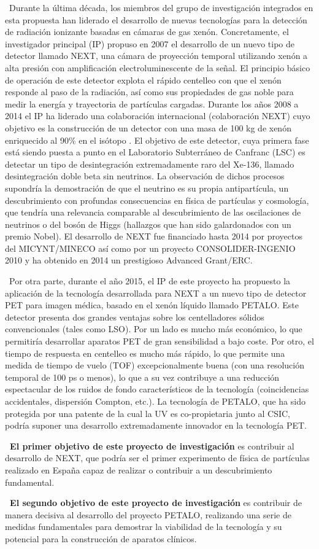 ~Durante la última década, los miembros del grupo de investigación integrados en esta propuesta han liderado el desarrollo de nuevas tecnologías para la detección de radiación ionizante basadas en cámaras de gas xenón. Concretamente, el investigador principal (IP) propuso en 2007 el desarrollo de un nuevo tipo de detector llamado NEXT, una cámara de proyección temporal utilizando xenón a alta presión con amplificación electroluminescente de la señal. El principio básico de operación de este detector explota el rápido centelleo con que el xenón responde al paso de la radiación, así como sus propiedades de gas noble para medir la energía y trayectoria de partículas cargadas. Durante los años 2008 a 2014 el IP  ha liderado una colaboración internacional (colaboración NEXT) cuyo objetivo es la construcción de un detector con una masa de 100 kg de xenón enriquecido al 90\% en el isótopo \XE. El objetivo de este detector, cuya primera fase está siendo puesta a punto en el Laboratorio Subterráneo de Canfranc (LSC) es detectar un tipo de desintegración extremadamente raro del Xe-136, llamado desintegración doble beta sin neutrinos. La observación de dichos procesos supondría la demostración de que el neutrino es su propia antipartícula, un descubrimiento con profundas consecuencias en física de partículas y cosmología, que tendría una relevancia comparable al descubrimiento de las oscilaciones de neutrinos o del bosón de Higgs (hallazgos que han sido galardonados con un premio Nobel). El desarrollo de NEXT fue financiado hasta 2014 por proyectos del MICYNT/MINECO así como por un proyecto CONSOLIDER-INGENIO 2010 y ha obtenido en 2014 un prestigioso Advanced Grant/ERC. 

~Por otra parte, durante el año 2015, el IP de este proyecto ha propuesto la aplicación de la tecnología desarrollada para NEXT a un nuevo tipo de detector PET para imagen médica, basado en el xenón líquido llamado PETALO. Este detector presenta dos grandes ventajas sobre los centelladores sólidos convencionales (tales como LSO). Por un lado es mucho más económico, lo que permitiría desarrollar aparatos PET de gran sensibilidad a bajo coste. Por otro, el tiempo de respuesta en centelleo es mucho más rápido, lo que permite una medida de tiempo de vuelo (TOF) excepcionalmente buena (con una resolución temporal de 100 ps o menos), lo que a su vez contribuye a una reducción espectacular de los ruidos de fondo característicos de la tecnología (coincidencias accidentales, dispersión Compton, etc.). La tecnología de PETALO, que ha sido protegida por una patente de la cual la UV es co-propietaria junto al CSIC, podría suponer una desarrollo extremadamente innovador en la tecnología PET.
 

{\bf ~El primer objetivo de este proyecto de investigación} es contribuir al desarrollo de NEXT, que podría ser el primer experimento de física de partículas realizado en España capaz de realizar o contribuir a un descubrimiento fundamental. 

{\bf ~El segundo objetivo de este proyecto de investigación} es contribuir de manera decisiva al desarrollo del proyecto PETALO, realizando una serie de medidas fundamentales para demostrar la viabilidad de la tecnología y su potencial para la construcción de aparatos clínicos. 